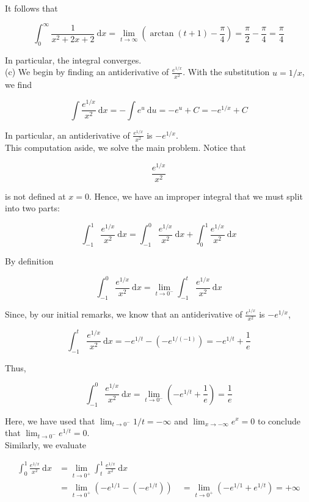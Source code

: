 \documentclass[10pt]{article}
\begin{document}
It follows that

$$
\int_{0}^{\infty} \frac{1}{x^{2}+2 x+2} \mathrm{~d} x=\lim _{t \rightarrow \infty}\left(\arctan (t+1)-\frac{\pi}{4}\right)=\frac{\pi}{2}-\frac{\pi}{4}=\frac{\pi}{4}
$$

In particular, the integral converges.\\
(c) We begin by finding an antiderivative of $\frac{e^{1 / x}}{x^{2}}$. With the substitution $u=1 / x$, we find

$$
\int \frac{e^{1 / x}}{x^{2}} \mathrm{~d} x=-\int e^{u} \mathrm{~d} u=-e^{u}+C=-e^{1 / x}+C
$$

In particular, an antiderivative of $\frac{e^{1 / x}}{x^{2}}$ is $-e^{1 / x}$.\\
This computation aside, we solve the main problem. Notice that

$$
\frac{e^{1 / x}}{x^{2}}
$$

is not defined at $x=0$. Hence, we have an improper integral that we must split into two parts:

$$
\int_{-1}^{1} \frac{e^{1 / x}}{x^{2}} \mathrm{~d} x=\int_{-1}^{0} \frac{e^{1 / x}}{x^{2}} \mathrm{~d} x+\int_{0}^{1} \frac{e^{1 / x}}{x^{2}} \mathrm{~d} x
$$

By definition

$$
\int_{-1}^{0} \frac{e^{1 / x}}{x^{2}} \mathrm{~d} x=\lim _{t \rightarrow 0^{-}} \int_{-1}^{t} \frac{e^{1 / x}}{x^{2}} \mathrm{~d} x
$$

Since, by our initial remarks, we know that an antiderivative of $\frac{e^{1 / x}}{x^{2}}$ is $-e^{1 / x}$,

$$
\int_{-1}^{t} \frac{e^{1 / x}}{x^{2}} \mathrm{~d} x=-e^{1 / t}-\left(-e^{1 /(-1)}\right)=-e^{1 / t}+\frac{1}{e}
$$

Thus,

$$
\int_{-1}^{0} \frac{e^{1 / x}}{x^{2}} \mathrm{~d} x=\lim _{t \rightarrow 0^{-}}\left(-e^{1 / t}+\frac{1}{e}\right)=\frac{1}{e}
$$

Here, we have used that $\lim _{t \rightarrow 0^{-}} 1 / t=-\infty$ and $\lim _{x \rightarrow-\infty} e^{x}=0$ to conclude that $\lim _{t \rightarrow 0^{-}} e^{1 / t}=0$.\\
Similarly, we evaluate

$$
\begin{aligned}
\int_{0}^{1} \frac{e^{1 / x}}{x^{2}} \mathrm{~d} x & =\lim _{t \rightarrow 0^{+}} \int_{t}^{1} \frac{e^{1 / x}}{x^{2}} \mathrm{~d} x \\
& =\lim _{t \rightarrow 0^{+}}\left(-e^{1 / 1}-\left(-e^{1 / t}\right)\right) \quad=\lim _{t \rightarrow 0^{+}}\left(-e^{1 / 1}+e^{1 / t}\right)=+\infty
\end{aligned}
$$
\end{document}
